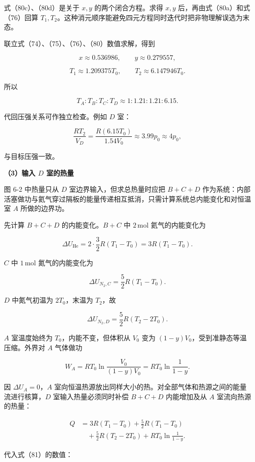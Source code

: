 \documentclass[12pt,a4paper,UTF8]{ctexart}
\begin{document}
式（80c）、（80d）是关于 \(x,y\) 的两个闭合方程。求得 \(x,y\)
后，再由式（80a）和式（76）回算
\(T_1,T_2\)。这种消元顺序能避免四元方程同时迭代时把非物理解误选为末态。

联立式（74）、（75）、（76）、（80）数值求解，得到

\[x\approx0.536986,\qquad y\approx0.279557,\]

\[T_1\approx1.209375T_0,\qquad T_2\approx6.147946T_0. \tag{81}\]

所以

\[\boxed{T_A:T_B:T_C:T_D
\approx1:1.21:1.21:6.15}. \tag{82}\]

代回压强关系可作独立检查。例如 \(D\) 室：

\[\frac{RT_2}{V_D}
=\frac{R(6.15T_0)}{1.54V_0}
\approx3.99p_0\approx4p_0,\]

与目标压强一致。

\textbf{（3）输入 \(D\) 室的热量}

图 6-2 中热量只从 \(D\) 室边界输入，但求总热量时应把 \(B+C+D\)
作为系统：内部活塞做功与氦气穿过隔板的能量传递相互抵消，只需计算系统总内能变化和对恒温室
\(A\) 所做的边界功。

先计算 \(B+C+D\) 的内能变化。\(B+C\) 中 \(2\,\mathrm{mol}\)
氦气的内能变化为

\[\Delta U_{\mathrm{He}}
=2\cdot\frac32R(T_1-T_0)
=3R(T_1-T_0). \tag{83}\]

\(C\) 中 \(1\,\mathrm{mol}\) 氮气的内能变化为

\[\Delta U_{N_2,C}=\frac52R(T_1-T_0). \tag{84}\]

\(D\) 中氮气初温为 \(2T_0\)，末温为 \(T_2\)，故

\[\Delta U_{N_2,D}=\frac52R(T_2-2T_0). \tag{85}\]

\(A\) 室温度始终为 \(T_0\)，内能不变，但体积从 \(V_0\) 变为
\((1-y)V_0\)，受到准静态等温压缩。外界对 \(A\) 气体做功

\[W_A=RT_0\ln\frac{V_0}{(1-y)V_0}
=RT_0\ln\frac1{1-y}. \tag{86}\]

因 \(\Delta U_A=0\)，\(A\)
室向恒温热源放出同样大小的热。对全部气体和热源之间的能量流进行核算，\(D\)
室输入热量必须同时补偿 \(B+C+D\) 内能增加及从 \(A\) 室流向热源的热量：

\[\begin{aligned}
Q
&=3R(T_1-T_0)
+\frac52R(T_1-T_0)\\
&\quad+\frac52R(T_2-2T_0)
+RT_0\ln\frac1{1-y}.
\end{aligned} \tag{87}\]

代入式（81）的数值：
\end{document}
